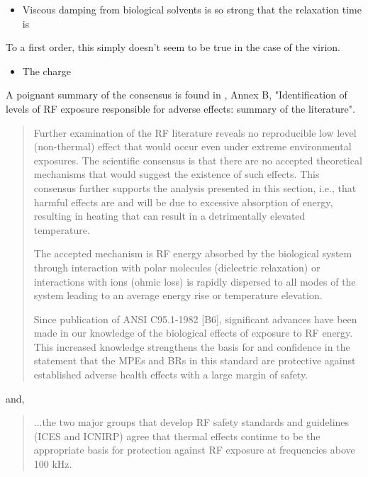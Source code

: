 \documentclass[paper.tex]{subfiles}
\begin{document}
\begin{itemize}
		\item Viscous damping from biological solvents is so strong that the relaxation time is 
\end{itemize}

To a first order, this simply doesn't seem to be true in the case of the virion.

\begin{itemize}
		\item The charge 
\end{itemize}








A poignant summary of the consensus is found in \cite{IEEE2006}, Annex B, "Identification of levels of RF exposure responsible for adverse effects: summary of the literature".

\begin{quote}
	Further examination of the RF literature reveals no reproducible low level (non-thermal) effect that would
	occur even under extreme environmental exposures. The scientific consensus is that there are no accepted
	theoretical mechanisms that would suggest the existence of such effects. This consensus further supports the
	analysis presented in this section, i.e., that harmful effects are and will be due to excessive absorption of
	energy, resulting in heating that can result in a detrimentally elevated temperature. 
	
	The accepted mechanism is RF energy absorbed by the biological system through interaction with polar molecules (dielectric relaxation) or interactions with ions (ohmic loss) is rapidly dispersed to all modes of the system leading to an average energy rise or temperature elevation. 
	
	Since publication of ANSI C95.1-1982 [B6], significant advances have been made in our knowledge of the biological effects of exposure to RF energy. This increased knowledge strengthens the basis for and confidence in the statement that the MPEs and BRs in this	standard are protective against established adverse health effects with a large margin of safety.
\end{quote}

and, 

\begin{quote}
	...the two major groups that develop RF safety standards and
	guidelines (ICES and ICNIRP) agree that thermal effects continue to be the appropriate basis for protection
	against RF exposure at frequencies above 100 kHz.
\end{quote}
\end{document}
